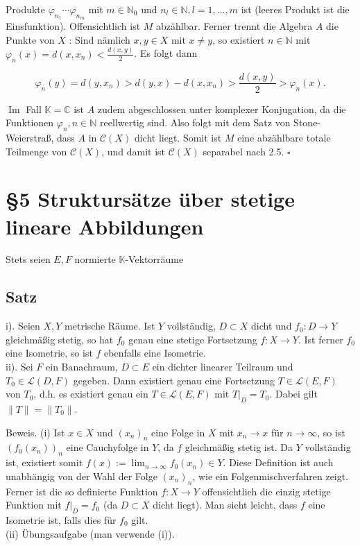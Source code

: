 \documentclass[10pt, letterpaper]{article}
\begin{document}
Produkte $\varphi_{n_{1}} \cdots \varphi_{n_{m}}$ mit $m \in \mathbb{N}_{0}$ und $n_{l} \in \mathbb{N}, l=1, \ldots, m$ ist (leeres Produkt ist die Einsfunktion). Offensichtlich ist $M$ abzählbar. Ferner trennt die Algebra $A$ die Punkte von $X$ : Sind nämlich $x, y \in X$ mit $x \neq y$, so existiert $n \in \mathbb{N}$ mit $\varphi_{n}(x)=d\left(x, x_{n}\right)<\frac{d(x, y)}{2}$. Es folgt dann

$$
\varphi_{n}(y)=d\left(y, x_{n}\right)>d(y, x)-d\left(x, x_{n}\right)>\frac{d(x, y)}{2}>\varphi_{n}(x) .
$$

$\operatorname{Im}$ Fall $\mathbb{K}=\mathbb{C}$ ist $A$ zudem abgeschlossen unter komplexer Konjugation, da die Funktionen $\varphi_{n}, n \in \mathbb{N}$ reellwertig sind. Also folgt mit dem Satz von Stone-Weierstraß, dass $A$ in $\mathcal{C}(X)$ dicht liegt. Somit ist $M$ eine abzählbare totale Teilmenge von $\mathcal{C}(X)$, und damit ist $\mathcal{C}(X)$ separabel nach 2.5. \(\square\)

\section*{§5 Struktursätze über stetige lineare Abbildungen}
Stets seien $E, F$ normierte $\mathbb{K}$-Vektorräume

\subsection*{Satz}
i). Seien $X, Y$ metrische Räume. Ist $Y$ vollständig, $D \subset X$ dicht und $f_{0}: D \rightarrow Y$ gleichmäßig stetig, so hat $f_{0}$ genau eine stetige Fortsetzung $f: X \rightarrow Y$. Ist ferner $f_{0}$ eine Isometrie, so ist $f$ ebenfalls eine Isometrie.\\
ii). Sei $F$ ein Banachraum, $D \subset E$ ein dichter linearer Teilraum und $T_{0} \in \mathcal{L}(D, F)$ gegeben. Dann existiert genau eine Fortsetzung $T \in \mathcal{L}(E, F)$ von $T_{0}$, d.h. es existiert genau ein $T \in \mathcal{L}(E, F)$ mit $\left.T\right|_{D}=T_{0}$. Dabei gilt $\|T\|=\left\|T_{0}\right\|$.

Beweis. (i) Ist $x \in X$ und $\left(x_{n}\right)_{n}$ eine Folge in $X$ mit $x_{n} \rightarrow x$ für $n \rightarrow \infty$, so ist $\left(f_{0}\left(x_{n}\right)\right)_{n}$ eine Cauchyfolge in $Y$, da $f$ gleichmäßig stetig ist. Da $Y$ vollständig ist, existiert somit $f(x):=\lim _{n \rightarrow \infty} f_{0}\left(x_{n}\right) \in Y$. Diese Definition ist auch unabhängig von der Wahl der Folge $\left(x_{n}\right)_{n}$, wie ein Folgenmischverfahren zeigt.\\
Ferner ist die so definierte Funktion $f: X \rightarrow Y$ offensichtlich die einzig stetige Funktion mit $\left.f\right|_{D}=f_{0}$ (da $D \subset X$ dicht liegt). Man sieht leicht, dass $f$ eine Isometrie ist, falls dies für $f_{0}$ gilt.\\
(ii) Übungsaufgabe (man verwende (i)).
\end{document}
